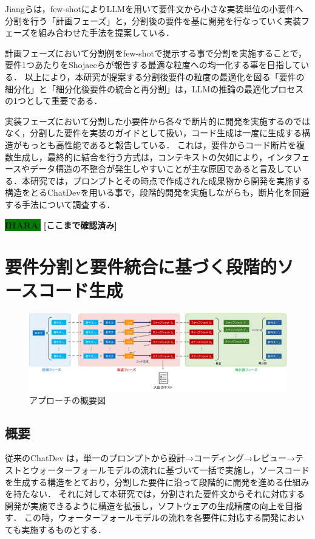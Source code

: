 \documentclass[submit,techrep,noauthor]{ipsj}
\newcommand{\ihara}[1]{\colorbox{green}{{\bf IHARA}:}{\color{blue} {\textbf{[#1]}}}}
\begin{document}
Jiangら\cite{tosem}は，few-shotによりLLMを用いて要件文から小さな実装単位の小要件へ分割を行う「計画フェーズ」と，分割後の要件を基に開発を行なっていく実装フェーズを組み合わせた手法を提案している．

計画フェーズにおいて分割例をfew-shotで提示する事で分割を実施することで，要件1つあたりをShojaeeらが報告する最適な粒度への均一化する事を目指している．
以上により，本研究が提案する分割後要件の粒度の最適化を図る「要件の細分化」と「細分化後要件の統合と再分割」は，LLMの推論の最適化プロセスの1つとして重要である．

実装フェーズにおいて分割した小要件から各々で断片的に開発を実施するのではなく，分割した要件を実装のガイドとして扱い，コード生成は一度に生成する構造がもっとも高性能であると報告している．
これは，要件からコード断片を複数生成し，最終的に結合を行う方式は，コンテキストの欠如により，インタフェースやデータ構造の不整合が発生しやすいことが主な原因であると言及している．本研究では，プロンプトとその時点で作成された成果物から開発を実施する構造をとるChatDevを用いる事で，段階的開発を実施しながらも，断片化を回避する手法について調査する．


\ihara{ここまで確認済み}

\section{要件分割と要件統合に基づく段階的ソースコード生成}
\label{sec:method}

\begin{figure}[t]
    \centering
    \includegraphics[width=1.0\linewidth]{./Toyoshima_fig/approach_abst_v3.pdf}
    \caption{アプローチの概要図}
    \label{approach_abst}
\end{figure}

\subsection{概要}
従来のChatDev\cite{qian-etal-2024-chatdev} は，単一のプロンプトから設計→コーディング→レビュー→テストとウォーターフォールモデルの流れに基づいて一括で実施し，ソースコードを生成する構造をとており，分割した要件に沿って段階的に開発を進める仕組みを持たない．
それに対して本研究では，分割された要件文からそれに対応する開発が実施できるように構造を拡張し，ソフトウェアの生成精度の向上を目指す．
この時，ウォーターフォールモデルの流れを各要件に対応する開発においても実施するものとする．
\end{document}
